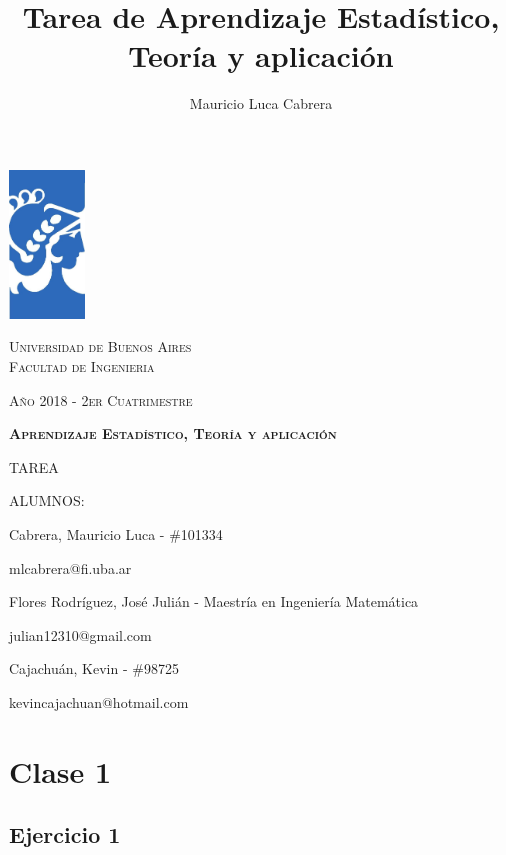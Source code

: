\documentclass[12pt, a4paper]{article}
\title{Tarea de Aprendizaje Estadístico, Teoría y aplicación}
\author{Mauricio Luca Cabrera}
\date{}
\begin{document}
\begin{titlepage} %
	\centering
	  \includegraphics[width=0.15\textwidth]{FIUBA_logo}\par
	  {\scshape\Large Universidad de Buenos Aires
      \\ Facultad de Ingenieria \par}
      {\scshape\small Año 2018 - 2er Cuatrimestre \par}
	  \vspace{1cm}
	  {\scshape\bfseries\LARGE Aprendizaje Estadístico, Teoría y aplicación\par}
	  \vspace{0.5cm}
	  \vspace{1cm}
      {\scshape\large TAREA \par}
      \vspace{0.5cm
      \raggedright}
      {\scshape\large  ALUMNOS: \par}
      \vspace{0.5cm}
    \centering
      {\normalsize  Cabrera, Mauricio Luca - \#101334 \par}
      {\small  mlcabrera@fi.uba.ar \par}
	  {\normalsize Flores Rodríguez, José Julián - Maestría en Ingeniería Matemática \par}
      {\small  julian12310@gmail.com \par}
	  {\normalsize Cajachuán, Kevin - \#98725 \par}
      {\small  kevincajachuan@hotmail.com \par}
\end{titlepage} %
\newpage
\tableofcontents
\newpage
\section{Clase 1}

\subsection{Ejercicio 1}
\end{document}
